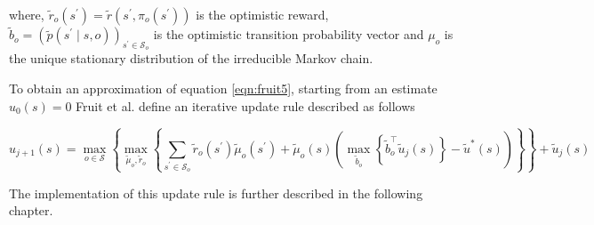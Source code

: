 where, $ \tilde{r}_o(s^\prime) =  \tilde{r}(s^\prime, \pi_o(s^\prime))$ is the optimistic reward, $\tilde{b}_o = (\tilde{p}(s^\prime \mid s, o))_{s^\prime \in \mathcal{S}_o}$ is the optimistic transition probability vector and $\mu_o$ is the unique stationary distribution of the irreducible Markov chain.

To obtain an approximation of equation \ref{eqn:fruit5}, starting from an estimate $u_0(s) = 0$ Fruit et al. define an iterative update rule described as follows

\begin{equation}
    \label{eqn:fruit7}
    u_{j+1}(s) = \max_{o \in \mathcal{S}} \left\{ \max_{\tilde{\mu}_o, \tilde{r}_o} \left\{ \sum_{s^\prime \in \mathcal{S}_o} \tilde{r}_o(s^\prime) \tilde{\mu}_o(s^\prime) + \tilde{\mu}_o(s) \left( \max_{\tilde{b}_o}\left\{ \tilde{b}_o^\top \tilde{u}_j(s) \right\} - \tilde{u}^*(s) \right) \right\} \right\} + \tilde{u}_j(s)
\end{equation}

The implementation of this update rule is further described in the following chapter.
